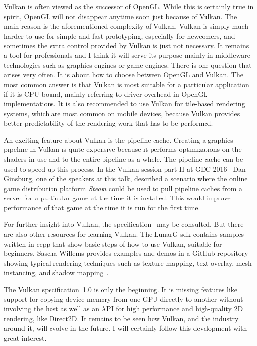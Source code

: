   Vulkan is often viewed as the successor of OpenGL.
  While this is certainly true in spirit, OpenGL will not disappear anytime soon just because of Vulkan.
  The main reason is the aforementioned complexity of Vulkan.
  Vulkan is simply much harder to use for simple and fast prototyping, especially for newcomers, and sometimes the extra control provided by Vulkan is just not necessary.
  It remains a tool for professionals and I think it will serve its purpose mainly in middleware technologies such as graphics engines or game engines.
  There is one question that arises very often.
  It is about how to choose between OpenGL and Vulkan.
  The most common answer is that Vulkan is most suitable for a particular application if it is CPU-bound, mainly referring to driver overhead in OpenGL implementations.
  It is also recommended to use Vulkan for tile-based rendering systems, which are most common on mobile devices, because Vulkan provides better predictability of the rendering work that has to be performed.

  An exciting feature about Vulkan is the pipeline cache.
  Creating a graphics pipeline in Vulkan is quite expensive because it performs optimizations on the shaders in use and to the entire pipeline as a whole.
  The pipeline cache can be used to speed up this process.
  In the Vulkan session part II at GDC 2016~\cite{vksessiongdc16} Dan Ginsburg, one of the speakers at this talk, described a scenario where the online game distribution platform \textit{Steam} could be used to pull pipeline caches from a server for a particular game at the time it is installed.
  This would improve performance of that game at the time it is run for the first time.

  For further insight into Vulkan, the specification~\cite{vkspec} may be consulted.
  But there are also other resources for learning Vulkan.
  The LunarG \gls{sdk} contains samples written in \gls{ccpp} that show basic steps of how to use Vulkan, suitable for beginners.
  Sascha Willems provides examples and demos in a GitHub repository showing typical rendering techniques such as texture mapping, text overlay, mesh instancing, and shadow mapping~\cite{saschawillemsgithubvulkan}.

  The Vulkan specification~1.0 is only the beginning.
  It is missing features like support for copying device memory from one GPU directly to another without involving the host as well as an API for high performance and high-quality 2D rendering, like Direct2D.
  It remains to be seen how Vulkan, and the industry around it, will evolve in the future.
  I will certainly follow this development with great interest.
